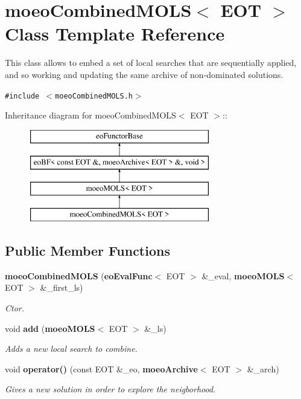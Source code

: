 \section{moeo\-Combined\-MOLS$<$ EOT $>$ Class Template Reference}
\label{classmoeoCombinedMOLS}
This class allows to embed a set of local searches that are sequentially applied, and so working and updating the same archive of non-dominated solutions.  


{\tt \#include $<$moeo\-Combined\-MOLS.h$>$}

Inheritance diagram for moeo\-Combined\-MOLS$<$ EOT $>$::\begin{figure}[H]
\begin{center}
\leavevmode
\includegraphics[height=4cm]{classmoeoCombinedMOLS}
\end{center}
\end{figure}
\subsection*{Public Member Functions}
\begin{CompactItemize}
\item 
{\bf moeo\-Combined\-MOLS} ({\bf eo\-Eval\-Func}$<$ EOT $>$ \&\_\-eval, {\bf moeo\-MOLS}$<$ EOT $>$ \&\_\-first\_\-ls)
\begin{CompactList}\small\item\em Ctor. \item\end{CompactList}\item 
void {\bf add} ({\bf moeo\-MOLS}$<$ EOT $>$ \&\_\-ls)
\begin{CompactList}\small\item\em Adds a new local search to combine. \item\end{CompactList}\item 
void {\bf operator()} (const EOT \&\_\-eo, {\bf moeo\-Archive}$<$ EOT $>$ \&\_\-arch)
\begin{CompactList}\small\item\em Gives a new solution in order to explore the neigborhood. \item\end{CompactList}\end{CompactItemize}
